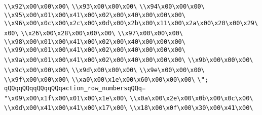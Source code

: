 \verb|\\x92\x00\x00\x00\|\newline
\verb|\\x93\x00\x00\x00\|\newline
\verb|\\x94\x00\x00\x00\|\newline
\verb|\\x95\x00\x01\x00\x41\x00\x02\x00\x40\x00\x00\x00\|\newline
\verb|\\x96\x00\x0c\x00\x2c\x00\x0d\x00\x2b\x00\x11\x00\x2a\x00\x20\x00\x29\x00\|\newline
\verb|\\x26\x00\x28\x00\x00\x00\|\newline
\verb|\\x97\x00\x00\x00\|\newline
\verb|\\x98\x00\x01\x00\x41\x00\x02\x00\x40\x00\x00\x00\|\newline
\verb|\\x99\x00\x01\x00\x41\x00\x02\x00\x40\x00\x00\x00\|\newline
\verb|\\x9a\x00\x01\x00\x41\x00\x02\x00\x40\x00\x00\x00\|\newline
\verb|\\x9b\x00\x00\x00\|\newline
\verb|\\x9c\x00\x00\x00\|\newline
\verb|\\x9d\x00\x00\x00\|\newline
\verb|\\x9e\x00\x00\x00\|\newline
\verb|\\x9f\x00\x00\x00\|\newline
\verb|\\xa0\x00\x1e\x00\x60\x00\x00\x00\|\newline
\verb|\";|\newline
\verb|qQQqqQQqqQQqqQQqaction_row_numbersqQQq=|\newline
\verb|"\x09\x00\x1f\x00\x01\x00\x1e\x00\|\newline
\verb|\\x0a\x00\x2e\x00\x0b\x00\x0c\x00\|\newline
\verb|\\x0d\x00\x41\x00\x41\x00\x17\x00\|\newline
\verb|\\x18\x00\x0f\x00\x30\x00\x41\x00\|\newline
